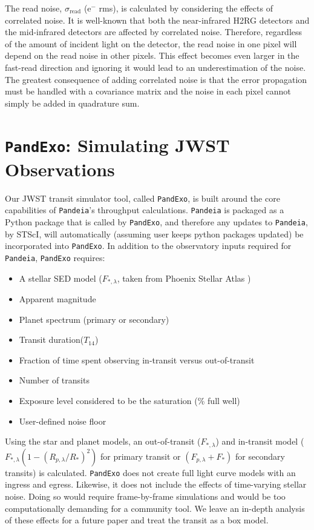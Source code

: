 \documentclass[iop]{emulateapj}
\begin{document}
The read noise, $\sigma_\textrm{read}$ (e$^-$ rms), is calculated by considering the 
effects of correlated noise. It is well-known that both the near-infrared 
H2RG detectors and the mid-infrared detectors are affected by correlated noise. 
Therefore, regardless of the amount of incident light on the detector, the 
read noise in one pixel will depend on the read noise in other pixels. This 
effect becomes even larger in the fast-read direction and ignoring it would 
lead to an underestimation of the noise. The greatest consequence of adding 
correlated noise is that the error propagation must be handled with a 
covariance matrix and the noise in each pixel cannot simply be added in 
quadrature sum. 

\section{\texttt{P\MakeLowercase{and}E\MakeLowercase{xo}}: Simulating JWST Observations}
Our JWST transit simulator tool, called \texttt{PandExo}, is built around the core capabilities of \texttt{Pandeia}'s throughput calculations. \texttt{Pandeia} is packaged as a
Python package that is called by \texttt{PandExo}, and therefore any updates to \texttt{Pandeia}, by STScI, will automatically (assuming user keeps python packages updated) be incorporated into \texttt{PandExo}.
In addition to the observatory inputs required for \texttt{Pandeia}, \texttt{PandExo} requires:
\begin{itemize}
    \item A stellar SED model ($F_{*,\lambda}$, taken from Phoenix Stellar Atlas \citep{huss13})
    \item Apparent magnitude 
    \item Planet spectrum (primary or secondary)
    \item Transit duration($T_{14}$)
    \item Fraction of time spent observing in-transit versus out-of-transit 
    \item Number of transits 
    \item Exposure level considered to be the saturation (\% full well)
    \item User-defined noise floor
\end{itemize}

Using the star and planet models, an out-of-transit ($F_{*,\lambda}$) and in-transit
model ($F_{*,\lambda}(1-(R_{p,\lambda}/R_*)^2)$ for primary transit or $(F_{p,\lambda} +
F_*)$ for secondary transits) is calculated. \texttt{PandExo} does not create full light curve
models with an ingress and egress. Likewise, it does not include the effects of time-varying
stellar noise. Doing so would require frame-by-frame simulations and would be too
computationally demanding for a community tool. We leave an in-depth analysis of these
effects for a future paper and treat the transit as a box model.  
\end{document}
